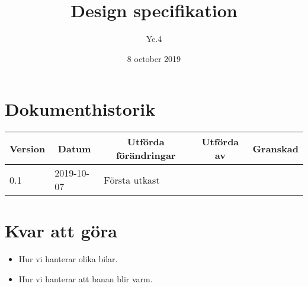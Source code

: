 \documentclass[10pt,oneside,swedish]{lips-no_customer}
\title{Design specifikation}
\author{Yc.4}
\date{8 october 2019}
\begin{document}
\maketitle

\cleardoublepage
\makeprojectid

\cleardoublepage
\tableofcontents

\cleardoublepage
\section*{Dokumenthistorik}
\begin{tabular}{p{}|p{}|p{}|p{}|p{}} 
  \multicolumn{1}{c}{\bfseries Version} & 
  \multicolumn{1}{|c}{\bfseries Datum} & 
  \multicolumn{1}{|c}{\bfseries Utförda förändringar} & 
  \multicolumn{1}{|c}{\bfseries Utförda av} & 
  \multicolumn{1}{|c}{\bfseries Granskad}\\
  \hline
  \hline
  0.1 & 2019-10-07 & Första utkast & & \\
  \hline
\end{tabular}

\cleardoublepage
{}\cfoot{\thepage}






\section{Kvar att göra}
\begin{itemize}
  \item Hur vi hanterar olika bilar.
  \item Hur vi hanterar att banan blir varm.
\end{itemize}
\end{document}
